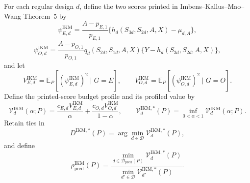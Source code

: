 For each regular design \(d\), define the two scores printed in Imbens--Kallus--Mao--Wang Theorem~5 by
\[
 \psi_{E,d}^{\mathrm{IKM}}
 =\frac{A-p_{E,1}}{p_{E,1}}
 \{h_d(S_{3d},S_{2d},A,X)-\mu_{d,A}\},
\]
\[
 \psi_{O,d}^{\mathrm{IKM}}
 =\frac{A-p_{O,1}}{p_{O,1}}
 q_d(S_{2d},S_{1d},A,X)
 \{Y-h_d(S_{3d},S_{2d},A,X)\},
\]
and let
\[
 V_{E,d}^{\mathrm{IKM}}
 =\mathbb E_P[(\psi_{E,d}^{\mathrm{IKM}})^2\mid G=E],
 \qquad
 V_{O,d}^{\mathrm{IKM}}
 =\mathbb E_P[(\psi_{O,d}^{\mathrm{IKM}})^2\mid G=O].
\]
Define the printed-score budget profile and its profiled value by
\[
 \mathcal V_d^{\mathrm{IKM}}(\alpha;P)
 =\frac{c_{E,d}V_{E,d}^{\mathrm{IKM}}}{\alpha}
 +\frac{c_{O,d}V_{O,d}^{\mathrm{IKM}}}{1-\alpha},
 \qquad
 \mathcal V_d^{\mathrm{IKM},*}(P)
 =\inf_{0<\alpha<1}\mathcal V_d^{\mathrm{IKM}}(\alpha;P).
\]
Retain ties in
\[
 D^{\mathrm{IKM},*}(P)
 =\arg\min_{d\in\mathcal D}\mathcal V_d^{\mathrm{IKM},*}(P),
\]
and define
\[
 \rho_{\mathrm{pred}}^{\mathrm{IKM}}(P)
 =\frac{\min_{d\in\mathcal D_{\mathrm{pred}}(P)}
 \mathcal V_d^{\mathrm{IKM},*}(P)}
 {\min_{d'\in\mathcal D}\mathcal V_{d'}^{\mathrm{IKM},*}(P)}.
\]